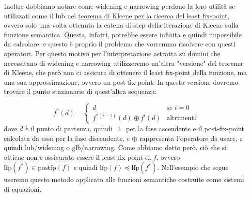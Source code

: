 Inoltre dobbiamo notare come widening e narrowing perdono la loro utilità se utilizzati come il lub nel \hyperref[teo:kleeneFixPoint]{teorema di Kleene per la ricerca del least fix-point}, ovvero solo una volta ottenuta la catena di step della iterazione di Kleene sulla funzione semantica. Questa, infatti, potrebbe essere infinita e quindi impossibile da calcolare, e questo è proprio il problema che vorremmo risolvere con questi operatori. Per questo motivo per l'interpretazione astratta su domini che necessitano di widening e narrowing utilizzeremo un'altra "versione" del teorema di Kleene, che però non ci assicura di ottenere il least fix-point della funzione, ma una sua approssimazione, ovvero un post-fix-point. In questa versione dovremo trovare il punto stazionario di quest'altra sequenza:

\[
f^{*}(d) =
\begin{cases}
    d &\textrm{se } i=0 \\
    f^{*(i-1)}(d) \oplus f^{i}(d) &\textrm{altrimenti}
\end{cases}
\]
dove \(d\) è il punto di partenza, quindi \(\perp\) per la fase ascendente e il post-fix-point calcolata da essa per la fase discendente, e \(\oplus\) rappresenta l'operatore da usare, e quindi lub/widening o glb/narrowing. Come abbiamo detto però, ciò che si ottiene non è assicurato essere il least fix-point di \(f\), ovvero \(\textrm{lfp}(f^{*})\in\textrm{postfp}(f)\) e quindi \(\textrm{lfp}(f)\preceq \textrm{lfp}(f^{*})\). Nell'esempio che segue useremo questo metodo applicato alle funzioni semantiche costruite come sistemi di equazioni. 

